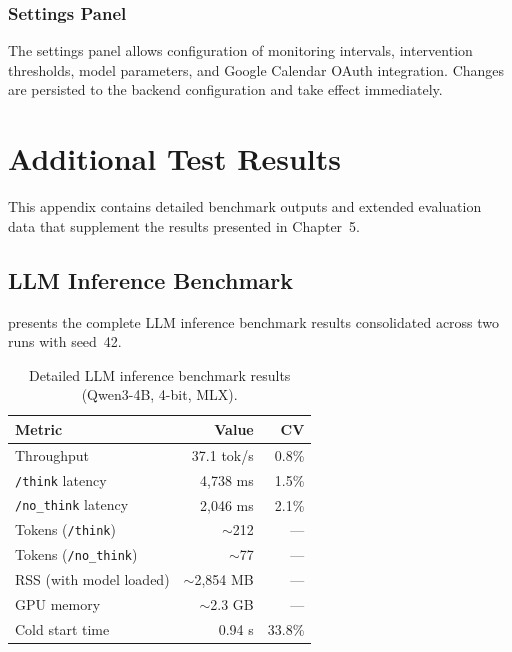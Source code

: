 \subsection{Settings Panel}

The settings panel allows configuration of monitoring intervals, intervention thresholds, model parameters, and Google Calendar OAuth integration. Changes are persisted to the backend configuration and take effect immediately.

\chapter{Additional Test Results}
\label{app:test-results}

This appendix contains detailed benchmark outputs and extended evaluation data that supplement the results presented in Chapter~5.

\section{LLM Inference Benchmark}

 presents the complete LLM inference benchmark results consolidated across two runs with seed~42.

\begin{table}[htbp]
  \centering
  \caption{Detailed LLM inference benchmark results (Qwen3-4B, 4-bit, MLX).}
  \label{tab:llm-benchmark-detail}
  \begin{tabular}{@{}lrr@{}}
    \toprule
    \textbf{Metric} & \textbf{Value} & \textbf{CV} \\
    \midrule
    Throughput                  & 37.1 tok/s   & 0.8\% \\
    \texttt{/think} latency    & 4,738 ms     & 1.5\% \\
    \texttt{/no\_think} latency & 2,046 ms    & 2.1\% \\
    Tokens (\texttt{/think})   & $\sim$212    & --- \\
    Tokens (\texttt{/no\_think}) & $\sim$77   & --- \\
    RSS (with model loaded)    & $\sim$2,854 MB & --- \\
    GPU memory                 & $\sim$2.3 GB & --- \\
    Cold start time            & 0.94 s       & 33.8\% \\
    \bottomrule
  \end{tabular}
\end{table}

